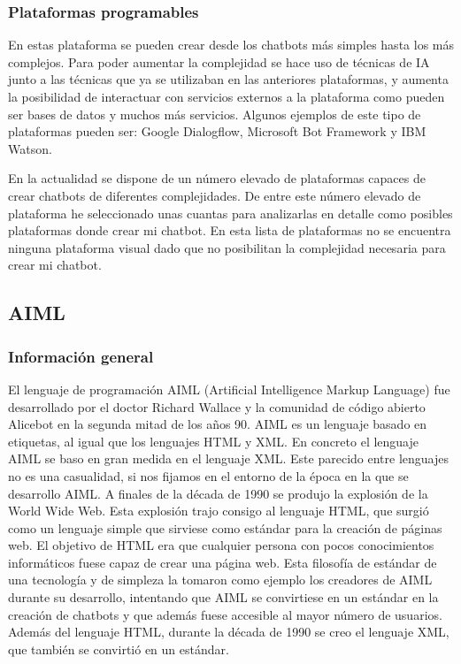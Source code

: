 \subsubsection*{Plataformas programables}

En estas plataforma se pueden crear desde los chatbots más simples hasta los más complejos. Para poder aumentar la complejidad se hace uso de técnicas de IA junto a las técnicas que ya se utilizaban en las anteriores plataformas, y aumenta la posibilidad de interactuar con servicios externos a la plataforma como pueden ser bases de datos y muchos más servicios. Algunos ejemplos de este tipo de plataformas pueden ser: Google Dialogflow, Microsoft Bot Framework y IBM Watson. \newline\newline


En la actualidad se dispone de un número elevado de plataformas capaces de crear chatbots de diferentes complejidades. De entre este número elevado de plataforma he seleccionado unas cuantas para analizarlas en detalle como posibles plataformas donde crear mi chatbot. En esta lista de plataformas no se encuentra ninguna plataforma visual dado que no posibilitan la complejidad necesaria para crear mi chatbot.


\subsection{AIML}

\subsubsection*{Información general}

El lenguaje de programación AIML (Artificial Intelligence Markup Language) fue desarrollado por el doctor Richard Wallace y la comunidad de código abierto Alicebot en la segunda mitad de los años 90. AIML es un lenguaje basado en etiquetas, al igual que los lenguajes HTML y XML. En concreto el lenguaje AIML se baso en gran medida en el lenguaje XML. Este parecido entre lenguajes no es una casualidad, si nos fijamos en el entorno de la época en la que se desarrollo AIML. A finales de la década de 1990 se produjo la explosión de la World Wide Web. Esta explosión trajo consigo al lenguaje HTML, que surgió como un lenguaje simple que sirviese como estándar para la creación de páginas web. El objetivo de HTML era que cualquier persona con pocos conocimientos informáticos fuese capaz de crear una página web. Esta filosofía de estándar de una tecnología y de simpleza la tomaron como ejemplo los creadores de AIML durante su desarrollo, intentando que AIML se convirtiese en un estándar en la creación de chatbots y que además fuese accesible al mayor número de usuarios. Además del lenguaje HTML, durante la década de 1990 se creo el lenguaje XML, que también se convirtió en un estándar.

